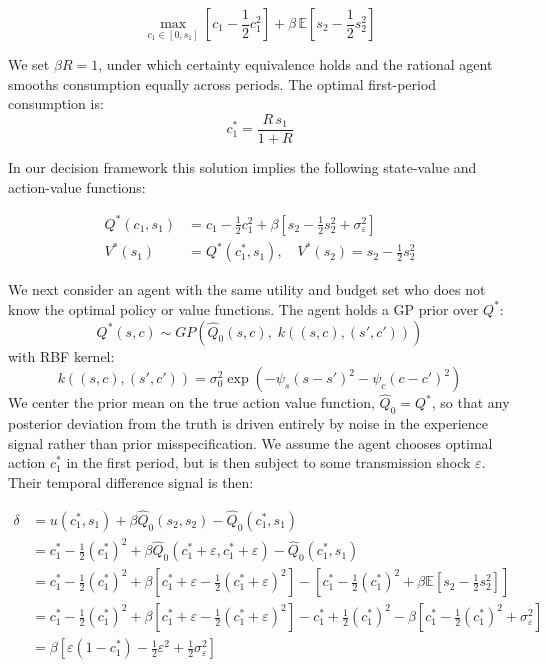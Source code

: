 \begin{equation}
    \max_{c_1 \in [0, s_1]} \left[c_1 - \frac{1}{2}c_1^2\right]
    + \beta \, \mathbb{E}\left[s_2 - \frac{1}{2}s_2^2\right]
\end{equation}

We set $\beta R = 1$, under which certainty equivalence holds and the rational agent smooths consumption
equally across periods. The optimal first-period consumption is:
\begin{equation}
    c_1^* = \frac{R \, s_1}{1 + R}
\end{equation}

In our decision framework this solution implies the following state-value and action-value functions:

\begin{align*}
    Q^*(c_1, s_1) &= c_1 - \frac{1}{2}c_1^2 + \beta \left[s_2 - \frac{1}{2}s_2^2 + \sigma_\varepsilon^2\right] \\
    V^*(s_1) &= Q^*(c_1^*, s_1), \quad V^*(s_2) = s_2 - \frac{1}{2}s_2^2
\end{align*}

We next consider an agent with the same utility and budget set who does not know the optimal policy or
value functions. The agent holds a GP prior over
$Q^*$:
\begin{equation}
  Q^*(s,c) \sim GP\left(
    \hat{Q}_0(s,c), \;
    k\left((s,c),(s',c')\right)
  \right)
\end{equation}
with RBF kernel:
\begin{equation}
  k\left((s,c),(s',c')\right) = \sigma_0^2
    \exp\left(
      -\psi_s(s - s')^2 - \psi_c(c - c')^2
    \right)
\end{equation}
We center the prior mean on the true action value function, $\hat{Q}_0 = Q^*$, so that any posterior
deviation from the truth is driven entirely by noise in the experience signal rather than prior
misspecification. We assume the agent chooses optimal action $c_1^*$ in the first period, 
but is then subject to some transmission shock $\varepsilon$. Their temporal difference 
signal is then:

\begin{align*}
    \delta &= u(c_1^*, s_1) + \beta \hat{Q}_0(s_2, s_2) - \hat{Q}_0(c_1^*, s_1) \\
    &= c_1^* - \tfrac{1}{2}(c_1^*)^2 + \beta \hat{Q}_0(c_1^* + \varepsilon, c_1^* + \varepsilon) - \hat{Q}_0(c_1^*, s_1) \\
    &= c_1^* - \tfrac{1}{2}(c_1^*)^2 + \beta \left[c_1^* + \varepsilon - \tfrac{1}{2}(c_1^* + \varepsilon)^2\right] - \left[c_1^* - \tfrac{1}{2}(c_1^*)^2 + \beta \mathbb{E}\left[s_2 - \tfrac{1}{2}s_2^2\right]\right] \\
    &= c_1^* - \tfrac{1}{2}(c_1^*)^2 + \beta \left[c_1^* + \varepsilon - \tfrac{1}{2}(c_1^* + \varepsilon)^2\right] - c_1^* + \tfrac{1}{2}(c_1^*)^2 - \beta \left[c_1^* - \tfrac{1}{2}(c_1^*)^2 + \sigma_\varepsilon^2\right] \\
    &= \beta \left[\varepsilon (1 - c_1^*) - \tfrac{1}{2}\varepsilon^2 + \tfrac{1}{2}\sigma_\varepsilon^2\right]
\end{align*}

